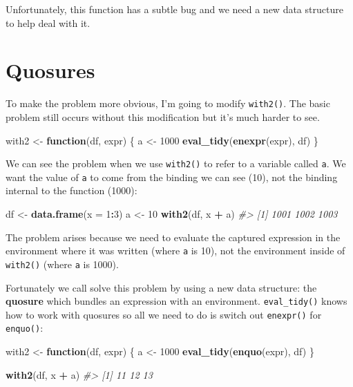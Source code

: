 \documentclass[]{book}
\newenvironment{Shaded}{\begin{snugshade}}{\end{snugshade}}
\newcommand{\CommentTok}[1]{\textcolor[rgb]{0.37,0.37,0.37}{\textit{#1}}}
\newcommand{\ControlFlowTok}[1]{\textcolor[rgb]{0.27,0.27,0.27}{\textbf{#1}}}
\newcommand{\DataTypeTok}[1]{\textcolor[rgb]{0.27,0.27,0.27}{#1}}
\newcommand{\DecValTok}[1]{\textcolor[rgb]{0.06,0.06,0.06}{#1}}
\newcommand{\KeywordTok}[1]{\textcolor[rgb]{0.27,0.27,0.27}{\textbf{#1}}}
\newcommand{\NormalTok}[1]{#1}
\newcommand{\OperatorTok}[1]{\textcolor[rgb]{0.43,0.43,0.43}{\textbf{#1}}}
\newcommand{\StringTok}[1]{\textcolor[rgb]{0.5,0.5,0.5}{#1}}
\begin{document}
Unfortunately, this function has a subtle bug and we need a new data structure to help deal with it.

\hypertarget{quosure-intro}{%
\section{Quosures}\label{quosure-intro}}

To make the problem more obvious, I'm going to modify \texttt{with2()}. The basic problem still occurs without this modification but it's much harder to see.

\begin{Shaded}
\begin{Highlighting}[]
\NormalTok{with2 <-}\StringTok{ }\ControlFlowTok{function}\NormalTok{(df, expr) \{}
\NormalTok{  a <-}\StringTok{ }\DecValTok{1000}
  \KeywordTok{eval_tidy}\NormalTok{(}\KeywordTok{enexpr}\NormalTok{(expr), df)}
\NormalTok{\}}
\end{Highlighting}
\end{Shaded}

We can see the problem when we use \texttt{with2()} to refer to a variable called \texttt{a}. We want the value of \texttt{a} to come from the binding we can see (10), not the binding internal to the function (1000):

\begin{Shaded}
\begin{Highlighting}[]
\NormalTok{df <-}\StringTok{ }\KeywordTok{data.frame}\NormalTok{(}\DataTypeTok{x =} \DecValTok{1}\OperatorTok{:}\DecValTok{3}\NormalTok{)}
\NormalTok{a <-}\StringTok{ }\DecValTok{10}
\KeywordTok{with2}\NormalTok{(df, x }\OperatorTok{+}\StringTok{ }\NormalTok{a)}
\CommentTok{#> [1] 1001 1002 1003}
\end{Highlighting}
\end{Shaded}

The problem arises because we need to evaluate the captured expression in the environment where it was written (where \texttt{a} is 10), not the environment inside of \texttt{with2()} (where \texttt{a} is 1000).

Fortunately we call solve this problem by using a new data structure: the \textbf{quosure} which bundles an expression with an environment. \texttt{eval\_tidy()} knows how to work with quosures so all we need to do is switch out \texttt{enexpr()} for \texttt{enquo()}:

\begin{Shaded}
\begin{Highlighting}[]
\NormalTok{with2 <-}\StringTok{ }\ControlFlowTok{function}\NormalTok{(df, expr) \{}
\NormalTok{  a <-}\StringTok{ }\DecValTok{1000}
  \KeywordTok{eval_tidy}\NormalTok{(}\KeywordTok{enquo}\NormalTok{(expr), df)}
\NormalTok{\}}

\KeywordTok{with2}\NormalTok{(df, x }\OperatorTok{+}\StringTok{ }\NormalTok{a)}
\CommentTok{#> [1] 11 12 13}
\end{Highlighting}
\end{Shaded}
\end{document}
